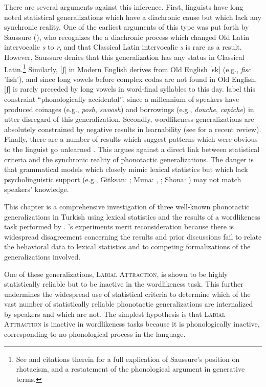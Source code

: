 There are several arguments against this inference. First, linguists have long noted statistical generalizations which have a diachronic cause but which lack any synchronic reality. One of the earliest arguments of this type was put forth by Saussure (\citeyear[202f.]{CLG}), who recognizes the a diachronic process which changed Old Latin intervocalic \emph{s} to \emph{r}, and that Classical Latin intervocalic \emph{s} is rare as a result. However, Saussure denies that this generalization has any status in Classical Latin.\footnote{See \citet{Gorman2012e} and citations therein for a full explication of Saussure's position on rhotacism, and a restatement of the phonological argument in generative terms.} Similarly, [ʃ] in Modern English derives from Old English [sk] (e.g., \emph{fisc} 'fish'), and since long vowels before complex codas are not found in Old English, [ʃ] is rarely preceded by long vowels in word-final syllables to this day. \citet{Iverson2005} label this constraint ``phonologically accidental'', since a millennium of speakers have produced coinages (e.g., \emph{posh}, \emph{swoosh}) and borrowings (e.g., \emph{douche}, \emph{capiche}) in utter disregard of this generalization. Secondly, wordlikeness generalizations are absolutely constrained by negative results in learnability (see \citealt{Yang2012} for a recent review). Finally, there are a number of results which suggest patterns which were obvious to the linguist go unlearned \citep[e.g.,][]{Becker2011,Hayes2006,Hayes2009,HayesInPress}. This argues against a direct link between statistical criteria and the synchronic reality of phonotactic generalizations. The danger is that grammatical models which closely mimic lexical statistics but which lack psycholinguistic support (e.g., Gitksan: \citealt{Brown2010}; Muna: \citealt{Anttila2008a}, \citealt{Coetzee2008a}; Shona: \citealt[][385]{Hayes2008a}) may not match speakers' knowledge. 

This chapter is a comprehensive investigation of three well-known phonotactic generalizations in Turkish using lexical statistics and the results of a wordlikeness task performed by \citet{Zimmer1969}. \citeauthor{Zimmer1969}'s experiments merit reconsideration because there is widespread disagreement concerning the results and prior discussions fail to relate the behavioral data to lexical statistics and to competing formalizations of the generalizations involved. 

One of these generalizations, \textsc{Labial Attraction}, is shown to be highly statistically reliable but to be inactive in the wordlikeness task. This further undermines the widespread use of statistical criteria to determine which of the vast number of statistically reliable phonotactic generalizations are internalized by speakers and which are not. The simplest hypothesis is that \textsc{Labial Attraction} is inactive in wordlikeness tasks because it is phonologically inactive, corresponding to no phonological process in the language.

